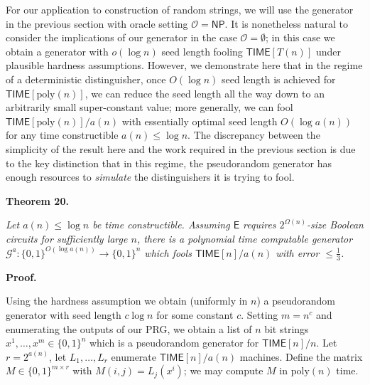 For our application to construction of random strings, we will use the generator in the previous section with oracle setting $\mathcal{O}={\mathsf{NP}}$. It is nonetheless natural to consider the implications of our generator in the case $\mathcal{O}=\emptyset$; in this case we obtain a generator with $o(\log n)$ seed length fooling ${\mathsf{TIME}}[T(n)]$ under plausible hardness assumptions. However, we demonstrate here that in the regime of a deterministic distinguisher, once $O(\log n)$ seed length is achieved for ${\mathsf{TIME}}[\mathrm{poly}(n)]$, we can reduce the seed length all the way down to an arbitrarily small super-constant value; more generally, we can fool ${\mathsf{TIME}}[\mathrm{poly}(n)]/a(n)$ with essentially optimal seed length $O(\log a(n))$ for any time constructible $a(n)\leq\log n$.
The discrepancy between the simplicity of the result here and the work required in the previous section is due to the key distinction that in this regime, the pseudorandom generator has enough resources to \emph{simulate} the distinguishers it is trying to fool.\par





\par\medskip\noindent\textbf{
\textbf{Theorem 20}\textbf{.}
}\par



\emph{Let $a(n)\leq\log n$ be time constructible. Assuming $\mathsf{E}$ requires $2^{\Omega(n)}$-size Boolean circuits for sufficiently large $n$, there is a polynomial time computable generator $\mathcal{G}^{a}:\{0,1\}^{O(\log a(n))}\to\{0,1\}^{n}$ which fools ${\mathsf{TIME}}[n]/a(n)$ with error $\leq\frac{1}{3}$.}\par






\par\medskip\noindent\textbf{Proof.}\par




Using the hardness assumption we obtain (uniformly in $n$) a pseudorandom generator with seed length $c\log n$ for some constant $c$. Setting $m=n^{c}$ and enumerating the outputs of our PRG, we obtain a list of $n$ bit strings $x^{1},\ldots,x^{m}\in\{0,1\}^{n}$ which is a pseudorandom generator for ${\mathsf{TIME}}[n]/n$. Let $r=2^{a(n)}$, let $L_{1},\ldots,L_{r}$ enumerate ${\mathsf{TIME}}[n]/a(n)$ machines. Define the matrix $M\in\{0,1\}^{m\times r}$ with $M(i,j)=L_{j}(x^{i})$; we may compute $M$ in $\mathrm{poly}(n)$ time.\par




